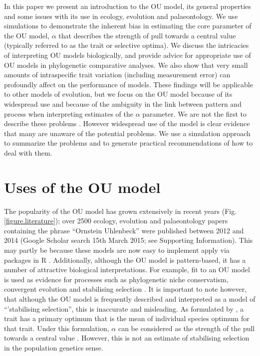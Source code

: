 \documentclass[a4paper,12pt]{article}
\begin{document}
  In this paper we present an introduction to the OU model, its general properties and some issues with its use in ecology, evolution and palaeontology.
  We use simulations to demonstrate the inherent bias in estimating the core parameter of the OU model, $\alpha$ that describes the strength of pull towards a central value (typically referred to as the trait or selective optima). We discuss the intricacies of interpreting OU models biologically, and provide advice for appropriate use of OU models in phylogenetic comparative analyses. 
  We also show that very small amounts of intraspecific trait variation (including measurement error) can profoundly affect on the performance of models. 
  These findings will be applicable to other models of evolution, but we focus on the OU model because of its widespread use and because of the ambiguity in the link between pattern and process when interpreting estimates of the $\alpha$ parameter. 
  We are not the first to describe these problems \citep[e.g.,][]{ho2013asymptotic,ho2014intrinsic,boettiger2012your,hansen2012interpreting,ives2010phylogenetic}. 
  However widespread use of the model is clear evidence that many are unaware of the potential problems. We use a simulation approach to summarize the problems and to generate practical recommendations of how to deal with them. 

\section{Uses of the OU model}
  The popularity of the OU model has grown extensively in recent years (Fig. \ref{figure.literature}); over 2500 ecology, evolution and palaeontology papers containing the phrase ``Ornstein Uhlenbeck'' were published between 2012 and 2014 (Google Scholar search 15th March 2015; see Supporting Information).
  This may partly be because these models are now easy to implement apply via packages in R \citep[e.g. ouch, GEIGER and OUwie;][]{Butler:2004aa,Harmon:2008aa,beaulieu2012ouwie}. 
  Additionally, although the OU model is pattern-based, it has a number of attractive biological interpretations. 
  For example, fit to an OU model is used as evidence for processes such as phylogenetic niche conservatism, convergent evolution and stabilising selection \citep[e.g.,][]{Wiens:2010aa,christin2013anatomical,ingram2013surface}. 
  It is important to note however, that although the OU model is frequently described and interpreted as a model of ``'stabilising selection'', this is inaccurate and misleading. 
  As formulated by \citet{hansen1997stabilizing}, a trait has a primary optimum that is the mean of individual species optimum for that trait. 
  Under this formulation, $\alpha$ can be considered as the strength of the pull towards a central value \citep[the primary optimum;][]{hansen2012adaptive}. 
  However, this is not an estimate of stabilising selection in the population genetics sense. 
\end{document}
